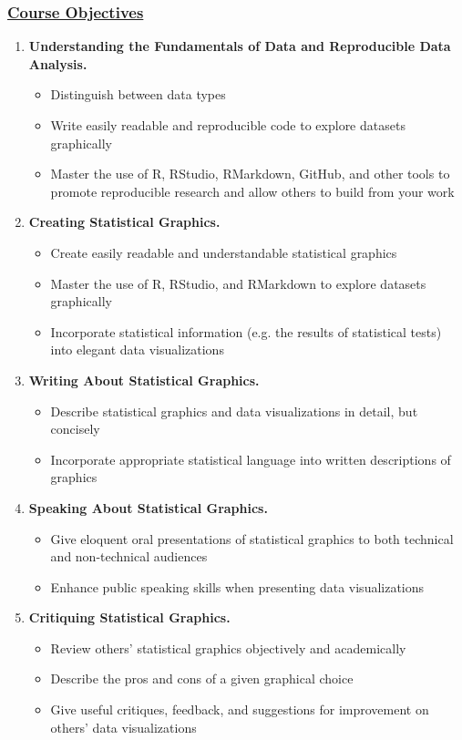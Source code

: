 \documentclass[11pt]{article}
\begin{document}
\vspace*{1mm}

\subsubsection*{\underline{Course Objectives}}
\begin{enumerate}
\item {\bf Understanding the Fundamentals of Data and Reproducible Data Analysis.}
\begin{itemize}
	\item Distinguish between data types
	\item Write easily readable and reproducible code to explore datasets graphically
	\item Master the use of R, RStudio, RMarkdown, GitHub, and other tools to promote reproducible research and allow others to build from your work
\end{itemize}

\item {\bf Creating Statistical Graphics.}
\begin{itemize}
	\item Create easily readable and understandable statistical graphics
	\item Master the use of R, RStudio, and RMarkdown to explore datasets graphically
	\item Incorporate statistical information (e.g. the results of statistical tests) into elegant data visualizations
\end{itemize}

\item {\bf Writing About Statistical Graphics.}
\begin{itemize}
	\item Describe statistical graphics and data visualizations in detail, but concisely
	\item Incorporate appropriate statistical language into written descriptions of graphics
\end{itemize}

\item {\bf Speaking About Statistical Graphics.}
\begin{itemize}
	\item Give eloquent oral presentations of statistical graphics to both technical and non-technical audiences
	\item Enhance public speaking skills when presenting data visualizations
\end{itemize}

\item {\bf Critiquing Statistical Graphics.}
\begin{itemize}
	\item Review others' statistical graphics objectively and academically
	\item Describe the pros and cons of a given graphical choice
	\item Give useful critiques, feedback, and suggestions for improvement on others' data visualizations
\end{itemize}

\end{enumerate}
\end{document}
